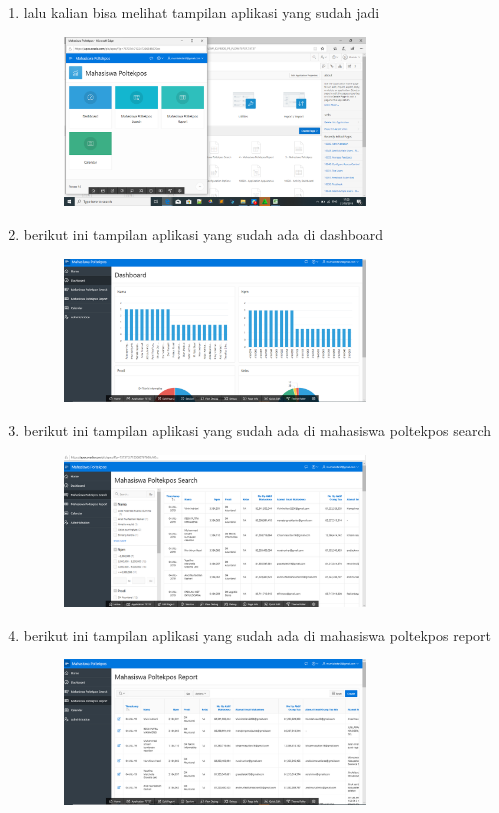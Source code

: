 \documentclass{article}
\begin{document}
\begin{enumerate}
\begin{figure}[h]
\end{figure}
\item lalu kalian bisa melihat tampilan aplikasi yang sudah jadi
    \begin{figure}[h]
   \centerline{\includegraphics[width=8cm]{figure/ci.png}}
\end{figure}
\item berikut ini tampilan aplikasi yang sudah ada di dashboard
    \begin{figure}[h]
   \centerline{\includegraphics[width=8cm]{figure/capture.png}}
\end{figure}
\newpage\item berikut ini tampilan aplikasi yang sudah ada di mahasiswa poltekpos search
    \begin{figure}[h]
   \centerline{\includegraphics[width=8cm]{figure/ccc.png}}
\end{figure}
\item berikut ini tampilan aplikasi yang sudah ada di mahasiswa poltekpos report
    \begin{figure}[h]
   \centerline{\includegraphics[width=8cm]{figure/capture3.png}}

\end{figure}
\end{enumerate}
\end{document}
